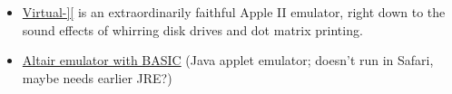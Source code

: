 \documentclass{article}
\begin{document}
\begin{itemize}
\item \href{http://virtualii.com}{Virtual-][} is an extraordinarily
  faithful Apple II emulator, right down to the sound effects of
  whirring disk drives and dot matrix printing.

\item \href{http://web.archive.org/web/20011211231432/http://www.rjh.org.uk/altair/4k/em/altem.htm}{Altair emulator with BASIC} (Java applet emulator; doesn't run in Safari,
maybe needs earlier JRE?)



\end{itemize}



\end{document}
